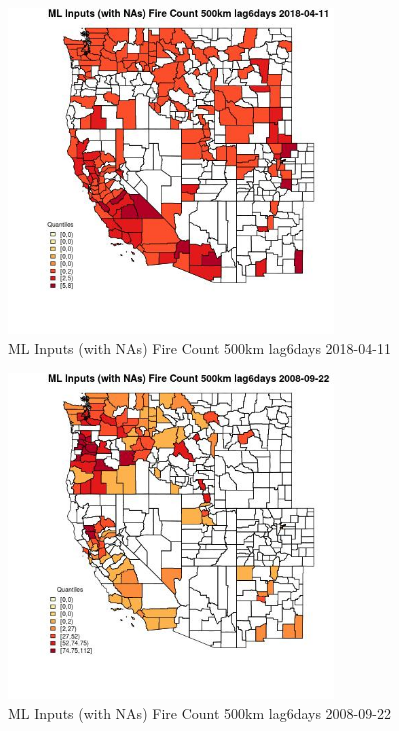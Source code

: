 \begin{figure} 
\centering  
\includegraphics[width=0.77\textwidth]{Code_Outputs/Report_ML_input_PM25_Step4_part_e_de_duplicated_aves_compiled_2019-05-18wNAs_CountyFire_Count_500km_lag6daysMean2018-04-11_2018-04-11.jpg} 
\caption{\label{fig:Report_ML_input_PM25_Step4_part_e_de_duplicated_aves_compiled_2019-05-18wNAsCountyFire_Count_500km_lag6daysMean2018-04-11_2018-04-11}ML Inputs (with NAs) Fire Count 500km lag6days 2018-04-11} 
\end{figure} 
 

\begin{figure} 
\centering  
\includegraphics[width=0.77\textwidth]{Code_Outputs/Report_ML_input_PM25_Step4_part_e_de_duplicated_aves_compiled_2019-05-18wNAs_CountyFire_Count_500km_lag6daysMean2008-09-22_2008-09-22.jpg} 
\caption{\label{fig:Report_ML_input_PM25_Step4_part_e_de_duplicated_aves_compiled_2019-05-18wNAsCountyFire_Count_500km_lag6daysMean2008-09-22_2008-09-22}ML Inputs (with NAs) Fire Count 500km lag6days 2008-09-22} 
\end{figure} 
 

